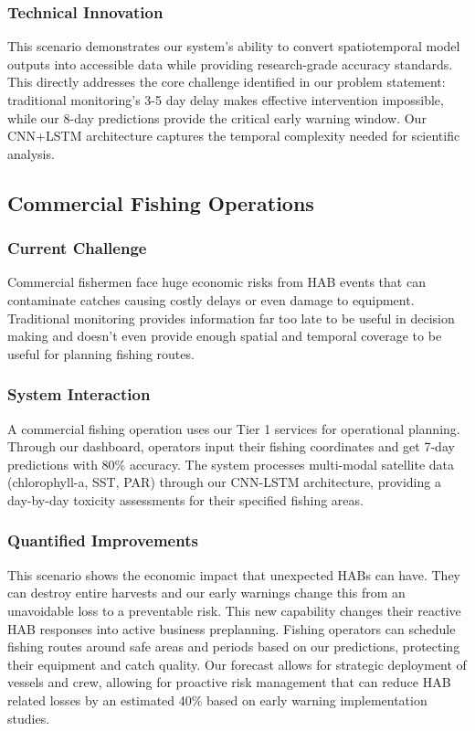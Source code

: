 \documentclass[conference]{IEEEtran}
\begin{document}
\subsubsection{Technical Innovation}
This scenario demonstrates our system's ability to convert spatiotemporal model outputs into accessible data while providing research-grade accuracy standards. This directly addresses the core challenge identified in our problem statement: traditional monitoring's 3-5 day delay makes effective intervention impossible, while our 8-day predictions provide the critical early warning window. Our CNN+LSTM architecture captures the temporal complexity needed for scientific analysis.

\subsection{Commercial Fishing Operations}

\subsubsection{Current Challenge}
Commercial fishermen face huge economic risks from HAB events that can contaminate catches causing costly delays or even damage to equipment. Traditional monitoring provides information far too late to be useful in decision making and doesn't even provide enough spatial and temporal coverage to be useful for planning fishing routes. 

\subsubsection{System Interaction}
A commercial fishing operation uses our Tier 1 services for operational planning. Through our dashboard, operators input their fishing coordinates and get 7-day predictions with 80\% accuracy. The system processes multi-modal satellite data (chlorophyll-a, SST, PAR) through our CNN-LSTM architecture, providing a day-by-day toxicity assessments for their specified fishing areas.
\subsubsection{Quantified Improvements}
This scenario shows the economic impact that unexpected HABs can have. They can destroy entire harvests and our early warnings change this from an unavoidable loss to a preventable risk. This new capability changes their reactive HAB responses into active business preplanning. Fishing operators can schedule fishing routes around safe areas and periods based on our predictions, protecting their equipment and catch quality. Our forecast allows for strategic deployment of vessels and crew, allowing for proactive risk management that can reduce HAB related losses by an estimated 40\% based on early warning implementation studies.
\end{document}
